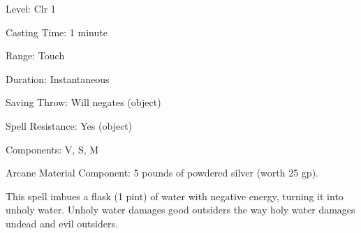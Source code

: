 
\begin{description*}
\item[Level:] Clr 1
\item[Casting Time:] 1 minute
\item[Range:] Touch
\item[Duration:] Instantaneous
\item[Saving Throw:] Will negates (object)
\item[Spell Resistance:] Yes (object)
\item[Components:] V, S, M
\item[Arcane Material Component:] 5 pounds of powdered silver (worth 25 gp).
\end{description*}

This spell imbues a flask (1 pint) of water with negative energy, turning it into
unholy water. Unholy water damages good outsiders the way holy water damages undead
and evil outsiders.